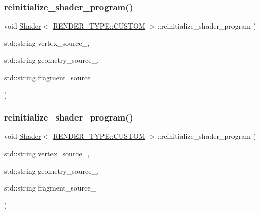\subsubsection{\texorpdfstring{reinitialize\+\_\+shader\+\_\+program()}{reinitialize\_shader\_program()}\hspace{0.1cm}{\footnotesize\ttfamily [1/2]}}
{\footnotesize\ttfamily void \mbox{\hyperlink{classShader}{Shader}}$<$ \mbox{\hyperlink{shader__class_8hpp_a24e288e18eb7b6e01de7565001fedb60a72baef04098f035e8a320b03ad197818}{R\+E\+N\+D\+E\+R\+\_\+\+T\+Y\+P\+E\+::\+C\+U\+S\+T\+OM}} $>$\+::reinitialize\+\_\+shader\+\_\+program (\begin{DoxyParamCaption}\item[{std\+::string}]{vertex\+\_\+source\+\_\+,  }\item[{std\+::string}]{geometry\+\_\+source\+\_\+,  }\item[{std\+::string}]{fragment\+\_\+source\+\_\+ }\end{DoxyParamCaption})\hspace{0.3cm}{\ttfamily [inline]}}

\mbox{\label{classShader_3_01RENDER__TYPE_1_1CUSTOM_01_4_a7f861a0b2f176f627124ceeae7354e19}} 
\subsubsection{\texorpdfstring{reinitialize\+\_\+shader\+\_\+program()}{reinitialize\_shader\_program()}\hspace{0.1cm}{\footnotesize\ttfamily [2/2]}}
{\footnotesize\ttfamily void \mbox{\hyperlink{classShader}{Shader}}$<$ \mbox{\hyperlink{shader__class_8hpp_a24e288e18eb7b6e01de7565001fedb60a72baef04098f035e8a320b03ad197818}{R\+E\+N\+D\+E\+R\+\_\+\+T\+Y\+P\+E\+::\+C\+U\+S\+T\+OM}} $>$\+::reinitialize\+\_\+shader\+\_\+program (\begin{DoxyParamCaption}\item[{std\+::string}]{vertex\+\_\+source\+\_\+,  }\item[{std\+::string}]{geometry\+\_\+source\+\_\+,  }\item[{std\+::string}]{fragment\+\_\+source\+\_\+ }\end{DoxyParamCaption})\hspace{0.3cm}{\ttfamily [inline]}}


